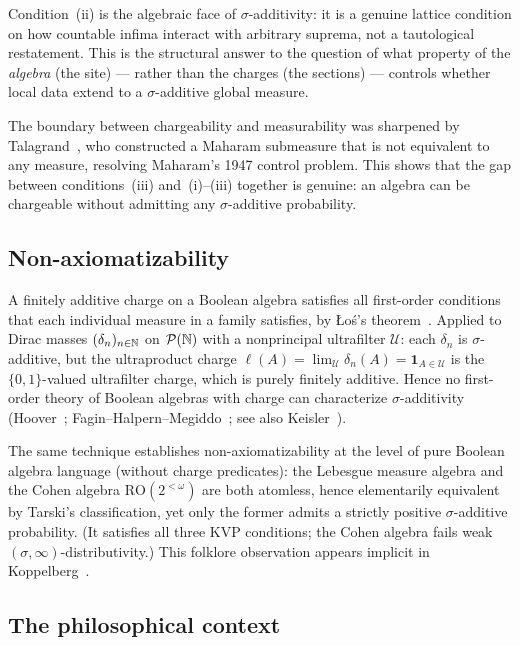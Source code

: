 Condition~(ii) is the algebraic face of $\sigma$-additivity: it is
a genuine lattice condition on how countable infima interact with
arbitrary suprema, not a tautological restatement.  This is the
structural answer to the question of what property of the
\emph{algebra} (the site) --- rather than the charges (the
sections) --- controls whether local data extend to a
$\sigma$-additive global measure.

The boundary between chargeability and measurability was sharpened by
Talagrand~\cite{Talagrand2008}, who constructed a Maharam submeasure
that is not equivalent to any measure, resolving Maharam's 1947
control problem.  This shows that the gap between conditions~(iii)
and~(i)--(iii) together is genuine: an algebra can be chargeable
without admitting any $\sigma$-additive probability.

\subsection{Non-axiomatizability}

A finitely additive charge on a Boolean algebra satisfies all
first-order conditions that each individual measure in a family
satisfies, by \L{}o\'{s}'s theorem~\cite{Los1955}.  Applied to
Dirac masses $(\delta_n)_{n \in \mathbb{N}}$ on $\mathcal{P}(\mathbb{N})$ with a
nonprincipal ultrafilter $\mathcal{U}$: each $\delta_n$ is
$\sigma$-additive, but the ultraproduct charge $\ell(A) =
\lim_\mathcal{U}\delta_n(A) = \mathbf{1}_{A \in \mathcal{U}}$ is
the $\{0,1\}$-valued ultrafilter charge, which is purely finitely
additive.  Hence no first-order theory of Boolean algebras with
charge can characterize $\sigma$-additivity
(Hoover~\cite{Hoover1978}; Fagin--Halpern--Megiddo~\cite{FaginHalpernMegiddo1990};
see also Keisler~\cite{Keisler1985}).

The same technique establishes non-axiomatizability at the level of
pure Boolean algebra language (without charge predicates): the
Lebesgue measure algebra and the Cohen algebra
$\mathrm{RO}(2^{<\omega})$ are both atomless, hence elementarily
equivalent by Tarski's classification, yet only the former admits a
strictly positive $\sigma$-additive probability.  (It satisfies all
three KVP conditions; the Cohen algebra fails weak
$(\sigma,\infty)$-distributivity.)  This folklore observation
appears implicit in Koppelberg~\cite[Ch.~18]{Koppelberg1989}.

\subsection{The philosophical context}
\label{sec:philosophical}


